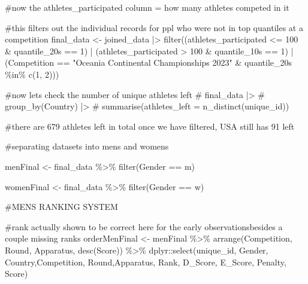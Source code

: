 \documentclass[
  letterpaper,
  DIV=11,
  numbers=noendperiod]{scrartcl}
\newenvironment{Shaded}{\begin{snugshade}}{\end{snugshade}}
\newcommand{\CommentTok}[1]{\textcolor[rgb]{0.37,0.37,0.37}{#1}}
\newcommand{\DecValTok}[1]{\textcolor[rgb]{0.68,0.00,0.00}{#1}}
\newcommand{\FunctionTok}[1]{\textcolor[rgb]{0.28,0.35,0.67}{#1}}
\newcommand{\NormalTok}[1]{\textcolor[rgb]{0.00,0.23,0.31}{#1}}
\newcommand{\OtherTok}[1]{\textcolor[rgb]{0.00,0.23,0.31}{#1}}
\newcommand{\SpecialCharTok}[1]{\textcolor[rgb]{0.37,0.37,0.37}{#1}}
\newcommand{\StringTok}[1]{\textcolor[rgb]{0.13,0.47,0.30}{#1}}
\begin{document}
\begin{Shaded}
\begin{Highlighting}[]
\CommentTok{\#now the athletes\_participated column = how many athletes competed in it}


\CommentTok{\#this filters out the individual records for ppl who were not in top quantiles at a competition}
\NormalTok{final\_data }\OtherTok{\textless{}{-}}\NormalTok{ joined\_data }\SpecialCharTok{|\textgreater{}}
  \FunctionTok{filter}\NormalTok{((athletes\_participated }\SpecialCharTok{\textless{}=} \DecValTok{100} \SpecialCharTok{\&}\NormalTok{ quantile\_20s }\SpecialCharTok{==} \DecValTok{1}\NormalTok{) }\SpecialCharTok{|}\NormalTok{ (athletes\_participated }\SpecialCharTok{\textgreater{}} \DecValTok{100} \SpecialCharTok{\&}\NormalTok{ quantile\_10s }\SpecialCharTok{==} \DecValTok{1}\NormalTok{) }\SpecialCharTok{|}\NormalTok{ (Competition }\SpecialCharTok{==} \StringTok{"Oceania Continental Championships 2023"} \SpecialCharTok{\&}\NormalTok{ quantile\_20s }\SpecialCharTok{\%in\%} \FunctionTok{c}\NormalTok{(}\DecValTok{1}\NormalTok{, }\DecValTok{2}\NormalTok{)))}

\CommentTok{\#now let\textquotesingle{}s check the number of unique athletes left}
\CommentTok{\# final\_data |\textgreater{}}
\CommentTok{\#   group\_by(Country) |\textgreater{}}
\CommentTok{\#   summarise(athletes\_left = n\_distinct(unique\_id))}

\CommentTok{\#there are 679 athletes left in total once we have filtered, USA still has 91 left}
\end{Highlighting}
\end{Shaded}

\begin{Shaded}
\begin{Highlighting}[]
\CommentTok{\#separating datasets into mens and womens}

\NormalTok{menFinal }\OtherTok{\textless{}{-}}\NormalTok{ final\_data }\SpecialCharTok{\%\textgreater{}\%} 
  \FunctionTok{filter}\NormalTok{(Gender }\SpecialCharTok{==} \StringTok{\textquotesingle{}m\textquotesingle{}}\NormalTok{)}

\NormalTok{womenFinal }\OtherTok{\textless{}{-}}\NormalTok{ final\_data }\SpecialCharTok{\%\textgreater{}\%} 
  \FunctionTok{filter}\NormalTok{(Gender }\SpecialCharTok{==} \StringTok{\textquotesingle{}w\textquotesingle{}}\NormalTok{)}
\end{Highlighting}
\end{Shaded}

\begin{Shaded}
\begin{Highlighting}[]
\CommentTok{\#MENS RANKING SYSTEM}

\CommentTok{\#rank actually shown to be correct here for the early observationsbesides a couple missing ranks}
\NormalTok{orderMenFinal }\OtherTok{\textless{}{-}}\NormalTok{ menFinal }\SpecialCharTok{\%\textgreater{}\%} 
  \FunctionTok{arrange}\NormalTok{(Competition, Round, Apparatus, }\FunctionTok{desc}\NormalTok{(Score)) }\SpecialCharTok{\%\textgreater{}\%} 
\NormalTok{  dplyr}\SpecialCharTok{::}\FunctionTok{select}\NormalTok{(unique\_id, Gender, Country,Competition, Round,Apparatus, Rank, D\_Score, E\_Score, Penalty, Score)}
\end{Highlighting}
\end{Shaded}
\end{document}
